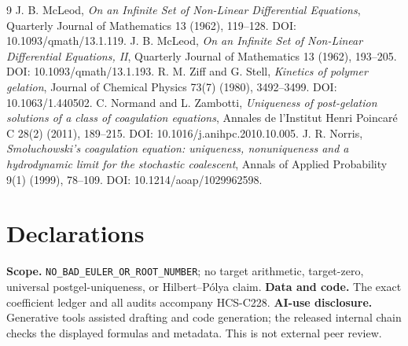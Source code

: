 \documentclass[11pt]{article}
\begin{document}
\begin{thebibliography}{9}
 J. B. McLeod, \emph{On an Infinite Set of Non-Linear
Differential Equations}, Quarterly Journal of Mathematics 13 (1962), 119--128.
DOI: 10.1093/qmath/13.1.119.
 J. B. McLeod, \emph{On an Infinite Set of Non-Linear
Differential Equations, II}, Quarterly Journal of Mathematics 13 (1962),
193--205. DOI: 10.1093/qmath/13.1.193.
 R. M. Ziff and G. Stell, \emph{Kinetics of polymer
gelation}, Journal of Chemical Physics 73(7) (1980), 3492--3499.
DOI: 10.1063/1.440502.
 C. Normand and L. Zambotti, \emph{Uniqueness of post-gelation
solutions of a class of coagulation equations}, Annales de l'Institut Henri
Poincaré C 28(2) (2011), 189--215. DOI: 10.1016/j.anihpc.2010.10.005.
 J. R. Norris, \emph{Smoluchowski's coagulation equation:
uniqueness, nonuniqueness and a hydrodynamic limit for the stochastic
coalescent}, Annals of Applied Probability 9(1) (1999), 78--109. DOI:
10.1214/aoap/1029962598.
\end{thebibliography}

\section*{Declarations}
\textbf{Scope.} \nolinkurl{NO_BAD_EULER_OR_ROOT_NUMBER}; no target arithmetic,
target-zero, universal postgel-uniqueness, or Hilbert--Pólya claim.
\textbf{Data and code.} The exact coefficient ledger and all audits accompany
HCS-C228.  \textbf{AI-use disclosure.} Generative tools assisted drafting and
code generation; the released internal chain checks the displayed formulas
and metadata.  This is not external peer review.
\end{document}
